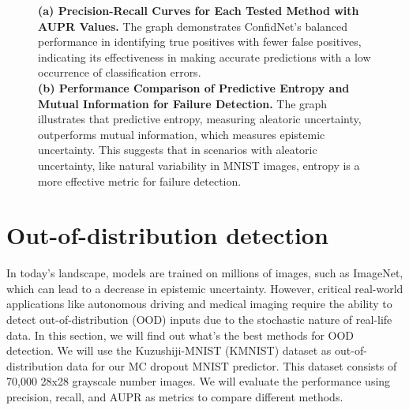 \begin{figure}[H]
\begin{subfigure}{0.45\textwidth}
        \caption{}
        \label{fig:failure_aupr_entropy_vs_mut_inf}
    \end{subfigure}%
    \caption{\textbf{(a) Precision-Recall Curves for Each Tested Method with AUPR Values.} The graph demonstrates ConfidNet's balanced performance in identifying true positives with fewer false positives, indicating its effectiveness in making accurate predictions with a low occurrence of classification errors.\\\textbf{(b) Performance Comparison of Predictive Entropy and Mutual Information for Failure Detection.} The graph illustrates that predictive entropy, measuring aleatoric uncertainty, outperforms mutual information, which measures epistemic uncertainty. This suggests that in scenarios with aleatoric uncertainty, like natural variability in MNIST images, entropy is a more effective metric for failure detection.}
\end{figure}

\section{Out-of-distribution detection}
In today's landscape, models are trained on millions of images, such as ImageNet, which can lead to a decrease in epistemic uncertainty. However, critical real-world applications like autonomous driving and medical imaging require the ability to detect out-of-distribution (OOD) inputs due to the stochastic nature of real-life data. In this section, we will find out what's the best methods for OOD detection. We will use the Kuzushiji-MNIST (KMNIST) dataset as out-of-distribution data for our MC dropout MNIST predictor. This dataset consists of 70,000 28x28 grayscale number images. We will evaluate the performance using precision, recall, and AUPR as metrics to compare different methods.

